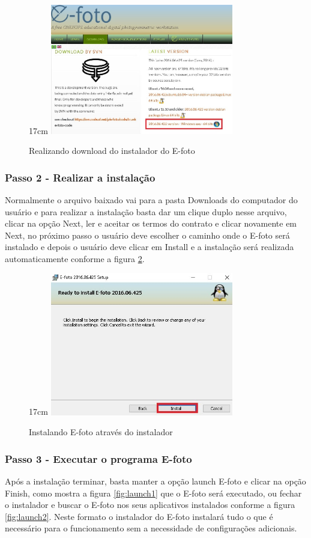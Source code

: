 \begin{figure}[!ht]{17cm}
	\centering
	\includegraphics[width=8cm]{Figuras/downmsi.jpg}
	\caption{Realizando download do instalador do E-foto} \label{fig:downmsi}
\end{figure}

\subsubsection{Passo 2 - Realizar a instalação}
Normalmente o arquivo baixado vai para a pasta Downloads do computador do usuário e para realizar a instalação basta dar um clique duplo nesse arquivo, clicar na opção Next, ler e aceitar os termos do contrato e clicar novamente em Next, no próximo passo o usuário deve escolher o caminho onde o E-foto será instalado e depois o usuário deve clicar em Install e a instalação será realizada automaticamente conforme a figura \ref{fig:installmsi}.
 
\begin{figure}[!ht]{17cm}
   \centering
   \includegraphics[width=8cm]{Figuras/installmsi.jpg}
   \caption{Instalando E-foto através do instalador} \label{fig:installmsi}
\end{figure}
  
\subsubsection{Passo 3 - Executar o programa E-foto}
Após a instalação terminar, basta manter a opção launch E-foto e clicar na opção Finish, como mostra a figura \ref{fig:launch1} que o E-foto será executado, ou fechar o instalador e buscar o E-foto nos seus aplicativos instalados conforme a figura \ref{fig:launch2}. Neste formato o instalador do E-foto instalará tudo o que é necessário para o funcionamento sem a necessidade de configurações adicionais.

